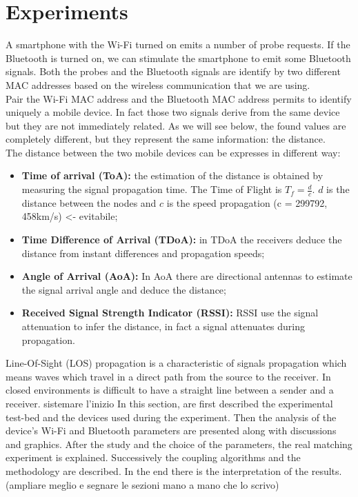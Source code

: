 \chapter{Experiments}
\label{capitolo5}
\thispagestyle{empty}
A smartphone with the Wi-Fi turned on emits a number of probe requests. If the Bluetooth is turned on, we can stimulate the smartphone to emit some Bluetooth signals. Both the probes and the Bluetooth signals are identify by two different MAC addresses based on the wireless communication that we are using.\\
Pair the Wi-Fi MAC address and the Bluetooth MAC address permits to identify uniquely a mobile device. In fact those two signals derive from the same device but they are not immediately related. As we will see below, the found values are completely different, but they represent the same information: the distance.\\
\linebreak
The distance between the two mobile devices can be expresses in different way:
\begin{itemize}
\item \textbf{Time of arrival (ToA):} the estimation of the distance is obtained by measuring the signal propagation time. {The Time of Flight is \(T_f = \frac{d}{c}\). \(d\) is the distance between the nodes and \(c\) is the speed propagation (c = 299792, 458km/s)} <- evitabile;
\item \textbf{Time Difference of Arrival (TDoA):} in TDoA the receivers deduce the distance from instant differences and propagation speeds;
\item \textbf{Angle of Arrival (AoA):} In AoA there are directional antennas to estimate the signal arrival angle and deduce the distance;
\item \textbf{Received Signal Strength Indicator (RSSI):} RSSI use the signal attenuation to infer the distance, in fact a signal attenuates during propagation.
\end{itemize}
Line-Of-Sight (LOS) propagation is a characteristic of signals propagation which means waves which travel in a direct path from the source to the receiver. In closed environments is difficult to have a straight line between a sender and a receiver.
sistemare l'inizio
In this section, are first described the experimental test-bed and the devices used during the experiment. Then the analysis of the device's Wi-Fi and Bluetooth parameters are presented along with discussions and graphics. After the study and the choice of the parameters, the real matching experiment is explained. Successively the coupling algorithms and the methodology are described. In the end there is the interpretation of the results. (ampliare meglio e segnare le sezioni mano a mano che lo scrivo)\\

